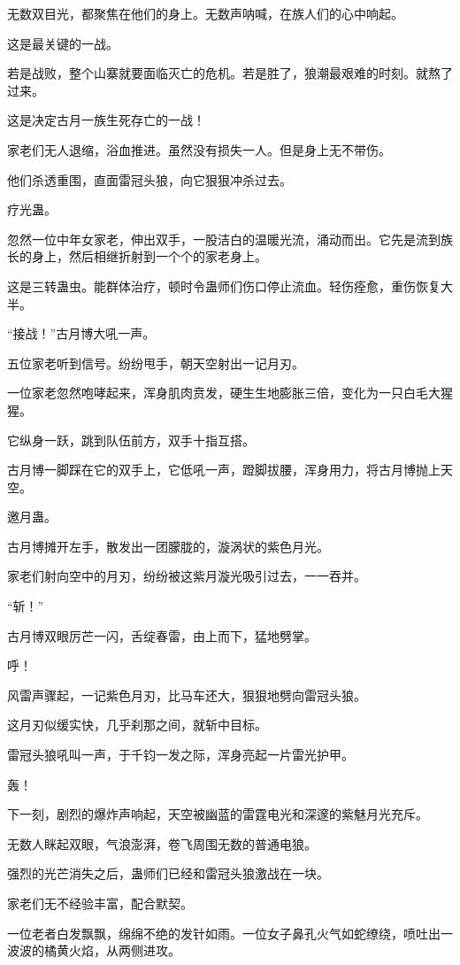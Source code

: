 \begin{this_body}
无数双目光，都聚焦在他们的身上。无数声呐喊，在族人们的心中响起。

这是最关键的一战。

若是战败，整个山寨就要面临灭亡的危机。若是胜了，狼潮最艰难的时刻。就熬了过来。

这是决定古月一族生死存亡的一战！

家老们无人退缩，浴血推进。虽然没有损失一人。但是身上无不带伤。

他们杀透重围，直面雷冠头狼，向它狠狠冲杀过去。

疗光蛊。

忽然一位中年女家老，伸出双手，一股洁白的温暖光流，涌动而出。它先是流到族长的身上，然后相继折射到一个个的家老身上。

这是三转蛊虫。能群体治疗，顿时令蛊师们伤口停止流血。轻伤痊愈，重伤恢复大半。

“接战！”古月博大吼一声。

五位家老听到信号。纷纷甩手，朝天空射出一记月刃。

一位家老忽然咆哮起来，浑身肌肉贲发，硬生生地膨胀三倍，变化为一只白毛大猩猩。

它纵身一跃，跳到队伍前方，双手十指互搭。

古月博一脚踩在它的双手上，它低吼一声，蹬脚拔腰，浑身用力，将古月博抛上天空。

邀月蛊。

古月博摊开左手，散发出一团朦胧的，漩涡状的紫色月光。

家老们射向空中的月刃，纷纷被这紫月漩光吸引过去，一一吞并。

“斩！”

古月博双眼厉芒一闪，舌绽春雷，由上而下，猛地劈掌。

呼！

风雷声骤起，一记紫色月刃，比马车还大，狠狠地劈向雷冠头狼。

这月刃似缓实快，几乎刹那之间，就斩中目标。

雷冠头狼吼叫一声，于千钧一发之际，浑身亮起一片雷光护甲。

轰！

下一刻，剧烈的爆炸声响起，天空被幽蓝的雷霆电光和深邃的紫魅月光充斥。

无数人眯起双眼，气浪澎湃，卷飞周围无数的普通电狼。

强烈的光芒消失之后，蛊师们已经和雷冠头狼激战在一块。

家老们无不经验丰富，配合默契。

一位老者白发飘飘，绵绵不绝的发针如雨。一位女子鼻孔火气如蛇缭绕，喷吐出一波波的橘黄火焰，从两侧进攻。


\end{this_body}
